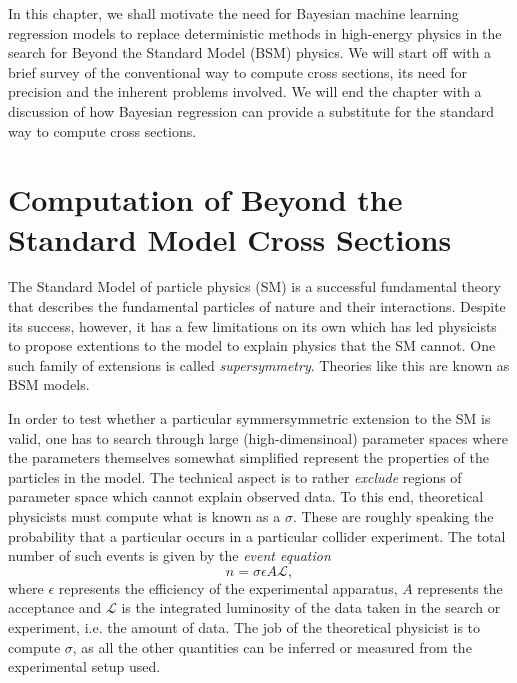 In this chapter, we shall motivate the need for Bayesian machine learning regression models to replace deterministic methods in high-energy physics in the search for Beyond the Standard Model (BSM) physics. We will start off with a brief survey of the conventional way to compute cross sections, its need for precision and the inherent problems involved. We will end the chapter with a discussion of how Bayesian regression can provide a substitute for the standard way to compute cross sections.


\section{Computation of Beyond the Standard Model Cross Sections}
The Standard Model of particle physics (SM) is a successful fundamental theory that describes the fundamental particles of nature and their interactions.  Despite its success, however, it has a few limitations on its own which has led physicists to propose extentions to the model to explain physics that the SM cannot. One such family of extensions is called \textit{supersymmetry}. Theories like this are known as BSM models. 

In order to test whether a particular symmersymmetric extension to the SM is valid, one has to search through large (high-dimensinoal) parameter spaces where the parameters themselves somewhat simplified represent the properties of the particles in the model. The technical aspect is to rather \textit{exclude} regions of parameter space which cannot explain observed data. To this end, theoretical physicists must compute what is known as a  $\sigma$. These are roughly speaking the probability that a particular  occurs in a particular collider experiment. The total number of such events is given by the \textit{event equation}
\begin{equation}\label{eq:event_equation}
    n = \sigma \epsilon A \mathcal{L},
\end{equation}
where $\epsilon$ represents the efficiency of the experimental apparatus, $A$ represents the acceptance and $\mathcal{L}$ is the integrated luminosity of the data taken in the search or experiment, i.e. the amount of data. The job of the theoretical physicist is to compute $\sigma$, as all the other quantities can be inferred or measured from the experimental setup used.

